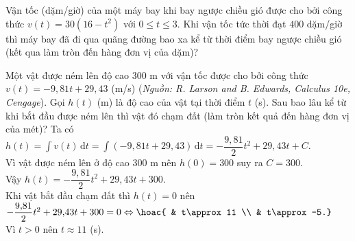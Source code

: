 \begin{ex}%
Vận tốc (dặm/giờ) của một máy bay khi bay ngược chiều gió được cho bởi công thức $v(t) = 30\left(16-t^2 \right)$ với $0\leq t \leq 3$. Khi vận tốc tức thời đạt $400$ dặm/giờ thì máy bay đã đi qua quãng đường bao xa kể từ thời điểm bay ngược chiều gió (kết qua làm tròn đến hàng đơn vị của dặm)?
\end{ex}

\begin{ex}%
Một vật được ném lên độ cao $300$ m với vận tốc được cho bởi công thức $v(t)=-9{,}81t+29{,}43$ (m/s) (\textit{Nguồn: R. Larson and B. Edwards, Calculus 10e, Cengage}). Gọi $h(t)$ (m) là độ cao của vật tại thời điểm $t$ (s). Sau bao lâu kể từ khi bắt đầu được ném lên thì vật đó chạm đất (làm tròn kết quả đến hàng đơn vị của mét)?
\loigiai
{
Ta có $h(t)=\displaystyle\int\limits v(t)\mathrm{\,d}t=\displaystyle\int\limits \left(-9{,}81t+29{,}43\right)\mathrm{\,d}t=-\dfrac{9{,}81}{2}t^2+29{,}43t+C$. \\
Vì vật được ném lên ở độ cao $300$ m nên $h(0)=300$ suy ra $C=300$. \\
Vậy $h(t)=-\dfrac{9{,}81}{2}t^2+29{,}43t +300$. \\
Khi vật bắt đầu chạm đất thì $h(t)=0$ nên $-\dfrac{9{,}81}{2}t^2+29{,}43t+300=0 \Leftrightarrow \hoac{ & t\approx11 \\ & t\approx-5.}$ \\
Vì $t>0$ nên $t\approx11$ (s).
}
\end{ex}

